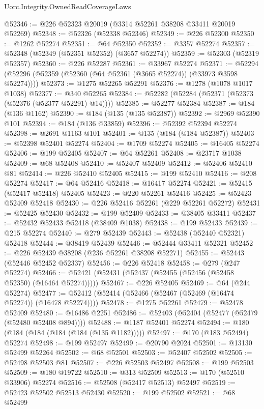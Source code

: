 \begin{lexlean}{Uorc.Integrity.OwnedReadCoverageLaws}
\begin{coremodule}
@52346 := @226 @52323 @20019 (@3314 @52261 @38208 @33411 @20019 @52269)
@52348 := @52326 (@52338 @52346)
@52349 := @226 @52300
@52350 := @1262 @52274
@52351 := @64 @52350
@52352 := @3357 @52274
@52357 := @52348 (@52349 (@52351 @52352) (@3657 @52274))
@52359 := @52303 (@52319 @52357)
@52360 := @226 @52287
@52361 := @33967 @52274
@52371 := @52294 (@52296 (@52359 (@52360 (@64 @52361 (@3665 @52274)) (@33973 @3598 @52274))))
@52373 := @1275 @52265 @52291
@52376 := @1278 (@1078 @1017 @1038)
@52377 := @340 @52265
@52384 := @52282 (@52284 (@52371 (@52373 (@52376 (@52377 @52291) @14))))
@52385 := @52277 @52384
@52387 := @184 (@136 @1162)
@52390 := @184 (@135 (@135 @52387))
@52392 := @2969 @52390 @101
@52394 := @184 (@136 @33859)
@52396 := @52392 @52394 @52274
@52398 := @2691 @1163 @101
@52401 := @135 (@184 (@184 @52387))
@52403 := @52398 @52401 @52274
@52404 := @1709 @52274
@52405 := @16405 @52274
@52406 := @199 @52405
@52407 := @64 @52261
@52408 := @23717 @1038
@52409 := @68 @52408
@52410 := @52407 @52409
@52412 := @52406 @52410 @81
@52414 := @226 @52410 @52405
@52415 := @199 @52410
@52416 := @208 @52274
@52417 := @64 @52416
@52418 := @16417 @52274
@52421 := @52415 (@52417 @52418) @52405
@52423 := @220 @52261 @52416
@52425 := @52423 @52409 @52418
@52430 := @226 @52416 @52261 (@229 @52261 @52272)
@52431 := @52425 @52430
@52432 := @199 @52409
@52433 := @38405 @33411
@52437 := @52432 @52433 @52418 (@38409 @1038)
@52438 := @199 @52433
@52439 := @215 @52274
@52440 := @279 @52439
@52443 := @52438 (@52440 @52321) @52418
@52444 := @38419 @52439
@52446 := @52444 @33411 @52321
@52452 := @226 @52439 @38208 (@236 @52261 @38208 @52271)
@52455 := @52443 (@52446 @52452 @52337)
@52456 := @226 @52418
@52458 := @279 (@247 @52274)
@52466 := @52421 (@52431 (@52437 (@52455 (@52456 (@52458 @52350) (@16464 @52274)))))
@52467 := @226 @52405
@52469 := @64 (@244 @52274)
@52477 := @52412 (@52414 (@52466 (@52467 (@52469 (@16474 @52274)) (@16478 @52274))))
@52478 := @1275 @52261
@52479 := @52478 @52409
@52480 := @16486 @2251
@52486 := @52403 (@52404 (@52477 (@52479 (@52480 @52408 @894))))
@52488 := @1187 @52401 @52274
@52494 := @180 (@184 (@184 (@184 (@184 (@135 @1182)))))
@52497 := @170 (@183 @52494) @52274
@52498 := @199 @52497
@52499 := @20790 @2024
@52501 := @13130 @52499 @52264
@52502 := @68 @52501
@52503 := @52407 @52502
@52505 := @52498 @52503 @81
@52507 := @226 @52503 @52497
@52508 := @199 @52503
@52509 := @180 @19722
@52510 := @313 @52509
@52513 := @170 (@52510 @33906) @52274
@52516 := @52508 (@52417 @52513) @52497
@52519 := @52423 @52502 @52513 @52430
@52520 := @199 @52502
@52521 := @68 @52499

\end{coremodule}
\end{lexlean}
